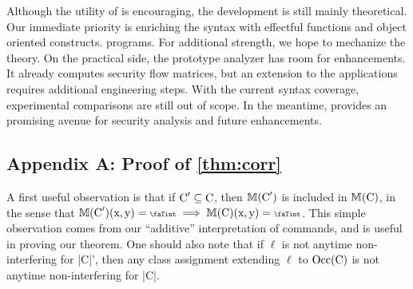 Although the utility of \lname is encouraging, the development is still mainly
theoretical. Our immediate priority is enriching the syntax with effectful
functions and object oriented constructs. %
programs. For additional strength, we hope to mechanize the theory. On the
practical side, the prototype analyzer has room for enhancements. It already
computes security flow matrices, but an extension to the applications requires
additional engineering steps. With the current syntax coverage, experimental
comparisons are still out of scope. In the meantime, \lname provides an
promising avenue for security analysis and future enhancements.

\subsection{Appendix A: Proof of \autoref{thm:corr}}\label{app:proof}

A first useful observation is that if \(\prc|C|' \subseteq \prc|C|\), then
\(\sfm{\prc|C|'}\) is included in \(\sfm{\prc|C|}\), in the sense that
\(\sfm{\prc|C|'}(\prc|x|, \prc|y|) = \vi \implies \sfm{\prc|C|}(\prc|x|,
\prc|y|) = \vi\). This simple observation comes from our \enquote{additive}
interpretation of commands, and is useful in proving our theorem. One should
also note that if \(\ell\) is not anytime non-interfering for \prc|C|', then any
class assignment extending \(\ell\) to \(\Occ(\prc|C|)\) is not anytime
non-interfering for \prc|C|.

\corrthm*

